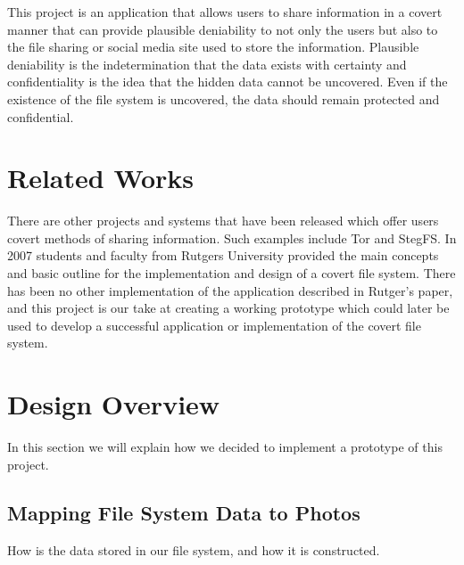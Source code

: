 \documentclass[12pt,journal,compsoc]{IEEEtran}
\begin{document}
This project is an application that allows users to share information in a covert manner that can provide plausible deniability to not only the users but also to the file sharing or social media site used to store the information. Plausible deniability is the indetermination that the data exists with certainty and confidentiality is the idea that the hidden data cannot be uncovered\cite{Baliga2007}. Even if the existence of the file system is uncovered, the data should remain protected and confidential. 

\section{Related Works}
There are other projects and systems that have been released which offer users covert methods of sharing information. Such examples include Tor and StegFS\cite{Tan2003}. In 2007 students and faculty from Rutgers University provided the main concepts and basic outline for the implementation and design of a covert file system\cite{Baliga2007}.  There has been no other implementation of the application described in Rutger's paper, and this project is our take at creating a working prototype which could later be used to develop a successful application or implementation of the covert file system.


\section{Design Overview}

In this section we will explain how we decided to implement a prototype of this project.





\subsection{Mapping File System Data to Photos}

How is the data stored in our file system, and how it is constructed.
\end{document}
